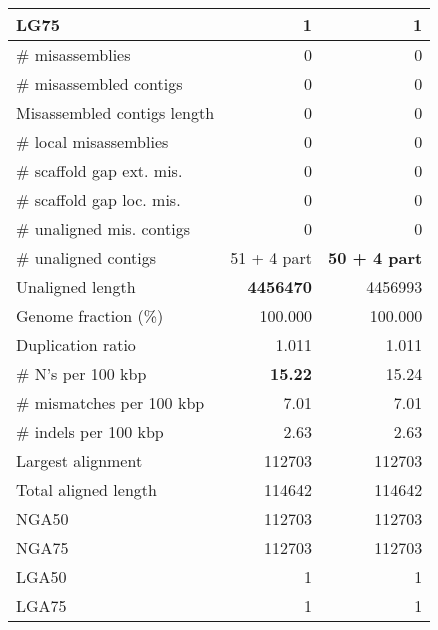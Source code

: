 \documentclass[12pt,a4paper]{article}
\begin{document}
\begin{table}[ht]
\begin{center}
\begin{tabular}{|l*{2}{|r}|}
LG75 & 1 & 1 \\ \hline
\# misassemblies & 0 & 0 \\ \hline
\# misassembled contigs & 0 & 0 \\ \hline
Misassembled contigs length & 0 & 0 \\ \hline
\# local misassemblies & 0 & 0 \\ \hline
\# scaffold gap ext. mis. & 0 & 0 \\ \hline
\# scaffold gap loc. mis. & 0 & 0 \\ \hline
\# unaligned mis. contigs & 0 & 0 \\ \hline
\# unaligned contigs & 51 + 4 part & {\bf 50 + 4 part} \\ \hline
Unaligned length & {\bf 4456470} & 4456993 \\ \hline
Genome fraction (\%) & 100.000 & 100.000 \\ \hline
Duplication ratio & 1.011 & 1.011 \\ \hline
\# N's per 100 kbp & {\bf 15.22} & 15.24 \\ \hline
\# mismatches per 100 kbp & 7.01 & 7.01 \\ \hline
\# indels per 100 kbp & 2.63 & 2.63 \\ \hline
Largest alignment & 112703 & 112703 \\ \hline
Total aligned length & 114642 & 114642 \\ \hline
NGA50 & 112703 & 112703 \\ \hline
NGA75 & 112703 & 112703 \\ \hline
LGA50 & 1 & 1 \\ \hline
LGA75 & 1 & 1 \\ \hline
\end{tabular}
\end{center}
\end{table}
\end{document}
